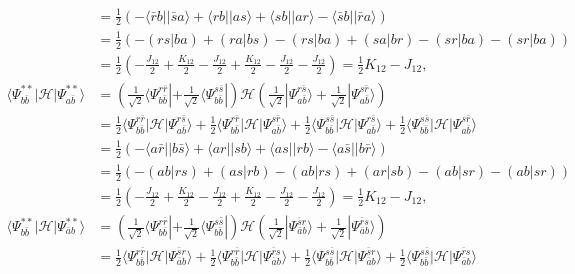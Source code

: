 \documentclass[a4paper]{book}
\newcounter{solution}[chapter]
\begin{document}
\begin{solution}
\begin{itemize}
\begin{align*}
		&= \frac{1}{2} \left( - \langle \bar{r} b || \bar{s} a \rangle + \langle r b || a s \rangle + \langle s b || a r \rangle - \langle \bar{s} b || \bar{r} a \rangle \right) \\
		&= \frac{1}{2} \left( - (rs|ba) + (ra|bs) - (rs|ba) + (sa|br) - (sr|ba) - (sr|ba) \right) \\
		&= \frac{1}{2} \left( - \frac{ J_{12} }{2} + \frac{ K_{12} }{2} - \frac{ J_{12} }{2} + \frac{ K_{12} }{2} - \frac{ J_{12} }{2} - \frac{ J_{12} }{2} \right) = \frac{1}{2} K_{12} - J_{12}, \\
		\langle \Psi^{**}_{b\bar{b}} | \mathscr{H} | \Psi^{**}_{a\bar{b}} \rangle &= \left( \frac{1}{ \sqrt{2} } \langle \Psi^{ r \bar{r} }_{b \bar{b}} | + \frac{1}{ \sqrt{2} } \langle \Psi^{ s \bar{s} }_{b \bar{b}} | \right) \mathscr{H} \left( \frac{1}{ \sqrt{2} } | \Psi^{ r \bar{s} }_{a \bar{b}} \rangle + \frac{1}{ \sqrt{2} } | \Psi^{ s \bar{r} }_{a \bar{b}} \rangle \right) \\
		&= \frac{1}{2} \langle \Psi^{ r \bar{r} }_{b \bar{b}} | \mathscr{H} | \Psi^{ r \bar{s} }_{a \bar{b}} \rangle + \frac{1}{2} \langle \Psi^{ r \bar{r} }_{b \bar{b}} | \mathscr{H} | \Psi^{ s \bar{r} }_{a \bar{b}} \rangle + \frac{1}{2} \langle \Psi^{ s \bar{s} }_{b \bar{b}} | \mathscr{H} | \Psi^{ r \bar{s} }_{a \bar{b}} \rangle + \frac{1}{2} \langle \Psi^{ s \bar{s} }_{b \bar{b}} | \mathscr{H} | \Psi^{ s \bar{r} }_{a \bar{b}} \rangle \\
		&= \frac{1}{2} \left( - \langle a \bar{r} || b \bar{s} \rangle + \langle a r || s b \rangle + \langle a s || r b \rangle - \langle a \bar{s} || b \bar{r} \rangle \right) \\
		&= \frac{1}{2} \left( -(ab|rs) + (as|rb) - (ab|rs) + (ar|sb) - (ab|sr) - (ab|sr) \right) \\
		&= \frac{1}{2} \left( - \frac{ J_{12} }{2} + \frac{ K_{12} }{2} - \frac{ J_{12} }{2} + \frac{ K_{12} }{2} - \frac{ J_{12} }{2} - \frac{ J_{12} }{2} \right) = \frac{1}{2} K_{12} - J_{12}, \\
		\langle \Psi^{**}_{b\bar{b}} | \mathscr{H} | \Psi^{**}_{ \bar{a} b} \rangle &= \left( \frac{1}{ \sqrt{2} } \langle \Psi^{ r \bar{r} }_{b \bar{b}} | + \frac{1}{ \sqrt{2} } \langle \Psi^{ s \bar{s} }_{b \bar{b}} | \right) \mathscr{H} \left( \frac{1}{ \sqrt{2} } | \Psi^{ \bar{s} r }_{\bar{a} b} \rangle + \frac{1}{ \sqrt{2} } | \Psi^{ \bar{r} s }_{\bar{a} b} \rangle \right) \\
		&= \frac{1}{2} \langle \Psi^{ r \bar{r} }_{b \bar{b}} | \mathscr{H} | \Psi^{ \bar{s} r }_{\bar{a} b} \rangle + \frac{1}{2} \langle \Psi^{ r \bar{r} }_{b \bar{b}} | \mathscr{H} | \Psi^{ \bar{r} s }_{\bar{a} b} \rangle + \frac{1}{2} \langle \Psi^{ s \bar{s} }_{b \bar{b}} | \mathscr{H} | \Psi^{ \bar{s} r }_{\bar{a} b} \rangle + \frac{1}{2} \langle \Psi^{ s \bar{s} }_{b \bar{b}} | \mathscr{H} | \Psi^{ \bar{r} s }_{\bar{a} b} \rangle \\

\end{align*}
\end{itemize}
\end{solution}
\end{document}
